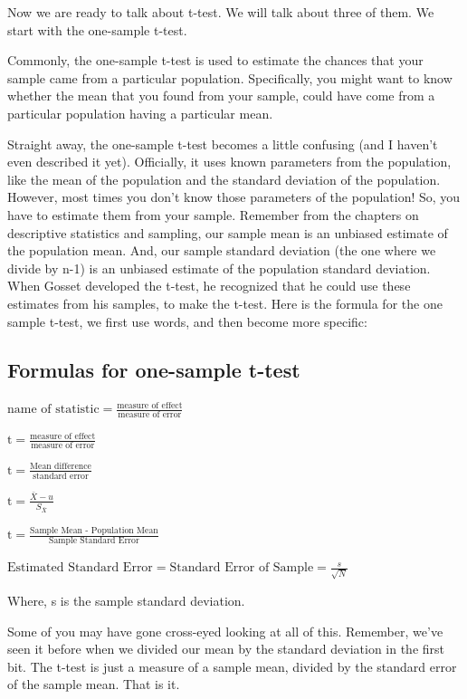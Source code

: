 \documentclass[
]{book}
\begin{document}
Now we are ready to talk about t-test. We will talk about three of them. We start with the one-sample t-test.

Commonly, the one-sample t-test is used to estimate the chances that your sample came from a particular population. Specifically, you might want to know whether the mean that you found from your sample, could have come from a particular population having a particular mean.

Straight away, the one-sample t-test becomes a little confusing (and I haven't even described it yet). Officially, it uses known parameters from the population, like the mean of the population and the standard deviation of the population. However, most times you don't know those parameters of the population! So, you have to estimate them from your sample. Remember from the chapters on descriptive statistics and sampling, our sample mean is an unbiased estimate of the population mean. And, our sample standard deviation (the one where we divide by n-1) is an unbiased estimate of the population standard deviation. When Gosset developed the t-test, he recognized that he could use these estimates from his samples, to make the t-test. Here is the formula for the one sample t-test, we first use words, and then become more specific:

\subsection{Formulas for one-sample t-test}\label{formulas-for-one-sample-t-test}

\(\text{name of statistic} = \frac{\text{measure of effect}}{\text{measure of error}}\)

\(\text{t} = \frac{\text{measure of effect}}{\text{measure of error}}\)

\(\text{t} = \frac{\text{Mean difference}}{\text{standard error}}\)

\(\text{t} = \frac{\bar{X}-u}{S_{\bar{X}}}\)

\(\text{t} = \frac{\text{Sample Mean  - Population Mean}}{\text{Sample Standard Error}}\)

\(\text{Estimated Standard Error} = \text{Standard Error of Sample} = \frac{s}{\sqrt{N}}\)

Where, s is the sample standard deviation.

Some of you may have gone cross-eyed looking at all of this. Remember, we've seen it before when we divided our mean by the standard deviation in the first bit. The t-test is just a measure of a sample mean, divided by the standard error of the sample mean. That is it.
\end{document}
